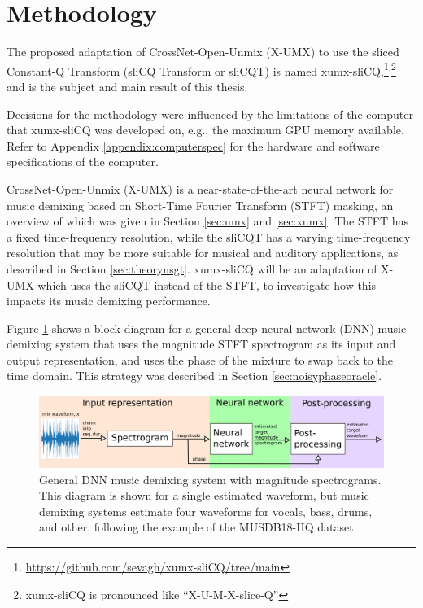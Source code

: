 \documentclass[report.tex]{subfiles}
\begin{document}
\section{Methodology}
\label{sec:methodology}

The proposed adaptation of CrossNet-Open-Unmix (X-UMX) to use the sliced Constant-Q Transform (sliCQ Transform or sliCQT) is named xumx-sliCQ,\footnote{\url{https://github.com/sevagh/xumx-sliCQ/tree/main}}\textsuperscript{,}\footnote{xumx-sliCQ is pronounced like ``X-U-M-X-slice-Q''} and is the subject and main result of this thesis.

Decisions for the methodology were influenced by the limitations of the computer that xumx-sliCQ was developed on, e.g., the maximum GPU memory available. Refer to Appendix \ref{appendix:computerspec} for the hardware and software specifications of the computer.

CrossNet-Open-Unmix (X-UMX) is a near-state-of-the-art neural network for music demixing based on Short-Time Fourier Transform (STFT) masking, an overview of which was given in Section \ref{sec:umx} and \ref{sec:xumx}. The STFT has a fixed time-frequency resolution, while the sliCQT has a varying time-frequency resolution that may be more suitable for musical and auditory applications, as described in Section \ref{sec:theorynsgt}. xumx-sliCQ will be an adaptation of X-UMX which uses the sliCQT instead of the STFT, to investigate how this impacts its music demixing performance.

Figure \ref{fig:generalmdx} shows a block diagram for a general deep neural network (DNN) music demixing system that uses the magnitude STFT spectrogram as its input and output representation, and uses the phase of the mixture to swap back to the time domain. This strategy was described in Section \ref{sec:noisyphaseoracle}.

\begin{figure}[ht]
	\centering
	\includegraphics[width=\textwidth]{./images-blockdiagrams/generic_mdx.png}
	\caption{General DNN music demixing system with magnitude spectrograms. This diagram is shown for a single estimated waveform, but music demixing systems estimate four waveforms for vocals, bass, drums, and other, following the example of the MUSDB18-HQ dataset}
	\label{fig:generalmdx}
\end{figure}
\end{document}
